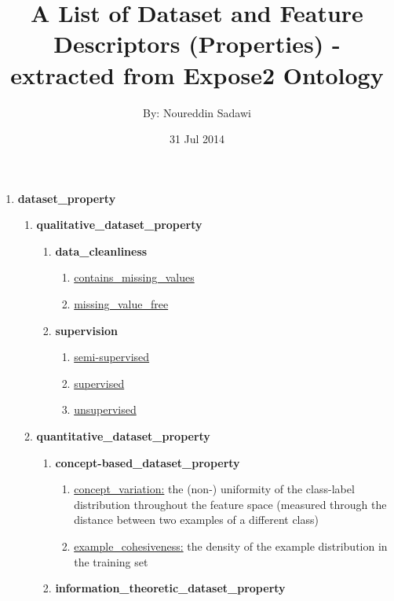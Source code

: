\documentclass[a4paper,12pt, english]{article}
\begin{document}
\title{A List of Dataset and Feature Descriptors (Properties) - extracted from Expose2 Ontology}
\date{31 Jul 2014}
\author{By: Noureddin Sadawi}
\maketitle

\large

\begin{enumerate}

\item \textbf{ dataset\_property}
		\begin{enumerate}
		\item \textbf{ qualitative\_dataset\_property}
			\begin{enumerate}
			\item \textbf{ data\_cleanliness}
				\begin{enumerate}
				\item \underline{contains\_missing\_values}
				\item \underline{missing\_value\_free}
				\end{enumerate}
			\item \textbf{supervision}
				\begin{enumerate}
				\item \underline{semi-supervised}
				\item \underline{supervised}
				\item \underline{unsupervised}
				\end{enumerate}
			\end{enumerate}
		\item \textbf{quantitative\_dataset\_property}
			\begin{enumerate}
			\item \textbf{concept-based\_dataset\_property}
				\begin{enumerate}
				\item \underline{concept\_variation:} the (non-) uniformity of the class-label distribution throughout the feature space (measured through the distance between two examples of a different class)
				\item \underline{example\_cohesiveness:}  the density of the example distribution in the training set
				\end{enumerate}			
			\item \textbf{information\_theoretic\_dataset\_property}

\end{enumerate}
\end{enumerate}
\end{enumerate}
\end{document}
